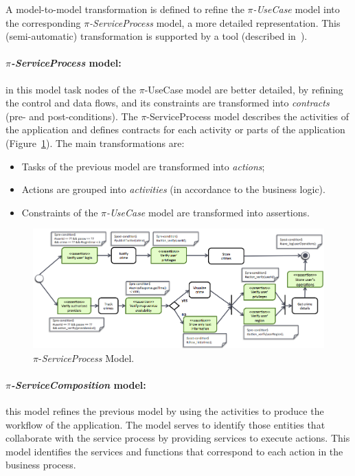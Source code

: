 A model-to-model transformation is defined to refine the \textit{$\pi$-UseCase} model into the
corresponding \textit{$\pi$-ServiceProcess} model, a more detailed representation. 
This (semi-automatic) transformation  is supported by a tool (described in~\cite{PlacidoThesis2012}).


\paragraph*{\textit{$\pi$-ServiceProcess} model:}
in this model task nodes of the $\pi$-UseCase model are better detailed, by refining the control and data flows, and its constraints are transformed into \textit{contracts} (pre- and post-conditions).
The $\pi$-ServiceProcess model describes the activities of the application and defines contracts for each activity or parts of the application (Figure~\ref{fig:piSP}). The main transformations are: 
\begin{itemize}
\item Tasks of the previous model are transformed into \textit{actions};
\item Actions are grouped into \textit{activities} (in accordance to the business logic).
\item Constraints of the \textit{$\pi$-UseCase} model are transformed into assertions.
\end{itemize}

\begin{figure}[t]
\centering
\includegraphics[width=1\textwidth]{figs/piServiceProcess.png}
\caption{$\pi$-\textit{ServiceProcess} Model.}
\label{fig:piSP}
\end{figure}

\paragraph*{\textit{$\pi$-ServiceComposition} model:} 
this model refines the previous model by using the activities to produce the workflow of the application.
The model serves to identify those entities that collaborate with the service process by providing services to execute actions. 
This model identifies the services and functions that correspond to each action in the business process.

